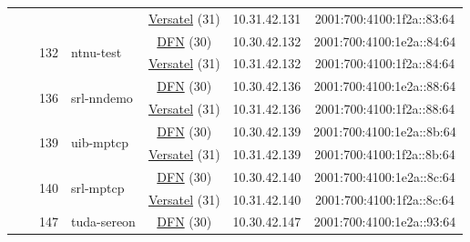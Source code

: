 \begin{small}
\begin{center}
\begin{longtable}{|c|c|c|c|c|c|c|c|}
  &  &  &  & \multicolumn{2}{|c|}{\tiny{\href{http://www.versatel.de}{Versatel} (31)}} & \tiny{10.31.42.131} & \tiny{2001:700:4100:1f2a::83:64} \\* \cline{3-3}\cline{4-4}\cline{5-5}\cline{6-6}\cline{7-7}\cline{8-8}
  &  & \multirow{2}{*}{\tiny{132}} & \multicolumn{1}{|l|}{\multirow{2}{*}{\tiny{ntnu-test}}} & \multicolumn{2}{|c|}{\tiny{\href{https://www.dfn.de}{DFN} (30)}} & \tiny{10.30.42.132} & \tiny{2001:700:4100:1e2a::84:64} \\* \cline{5-5}\cline{6-6}\cline{7-7}\cline{8-8}
  &  &  &  & \multicolumn{2}{|c|}{\tiny{\href{http://www.versatel.de}{Versatel} (31)}} & \tiny{10.31.42.132} & \tiny{2001:700:4100:1f2a::84:64} \\* \cline{3-3}\cline{4-4}\cline{5-5}\cline{6-6}\cline{7-7}\cline{8-8}
  &  & \multirow{2}{*}{\tiny{136}} & \multicolumn{1}{|l|}{\multirow{2}{*}{\tiny{srl-nndemo}}} & \multicolumn{2}{|c|}{\tiny{\href{https://www.dfn.de}{DFN} (30)}} & \tiny{10.30.42.136} & \tiny{2001:700:4100:1e2a::88:64} \\* \cline{5-5}\cline{6-6}\cline{7-7}\cline{8-8}
  &  &  &  & \multicolumn{2}{|c|}{\tiny{\href{http://www.versatel.de}{Versatel} (31)}} & \tiny{10.31.42.136} & \tiny{2001:700:4100:1f2a::88:64} \\* \cline{3-3}\cline{4-4}\cline{5-5}\cline{6-6}\cline{7-7}\cline{8-8}
  &  & \multirow{2}{*}{\tiny{139}} & \multicolumn{1}{|l|}{\multirow{2}{*}{\tiny{uib-mptcp}}} & \multicolumn{2}{|c|}{\tiny{\href{https://www.dfn.de}{DFN} (30)}} & \tiny{10.30.42.139} & \tiny{2001:700:4100:1e2a::8b:64} \\* \cline{5-5}\cline{6-6}\cline{7-7}\cline{8-8}
  &  &  &  & \multicolumn{2}{|c|}{\tiny{\href{http://www.versatel.de}{Versatel} (31)}} & \tiny{10.31.42.139} & \tiny{2001:700:4100:1f2a::8b:64} \\* \cline{3-3}\cline{4-4}\cline{5-5}\cline{6-6}\cline{7-7}\cline{8-8}
  &  & \multirow{2}{*}{\tiny{140}} & \multicolumn{1}{|l|}{\multirow{2}{*}{\tiny{srl-mptcp}}} & \multicolumn{2}{|c|}{\tiny{\href{https://www.dfn.de}{DFN} (30)}} & \tiny{10.30.42.140} & \tiny{2001:700:4100:1e2a::8c:64} \\* \cline{5-5}\cline{6-6}\cline{7-7}\cline{8-8}
  &  &  &  & \multicolumn{2}{|c|}{\tiny{\href{http://www.versatel.de}{Versatel} (31)}} & \tiny{10.31.42.140} & \tiny{2001:700:4100:1f2a::8c:64} \\* \cline{3-3}\cline{4-4}\cline{5-5}\cline{6-6}\cline{7-7}\cline{8-8}
  &  & \multirow{2}{*}{\tiny{147}} & \multicolumn{1}{|l|}{\multirow{2}{*}{\tiny{tuda-sereon}}} & \multicolumn{2}{|c|}{\tiny{\href{https://www.dfn.de}{DFN} (30)}} & \tiny{10.30.42.147} & \tiny{2001:700:4100:1e2a::93:64} \\* \cline{5-5}\cline{6-6}\cline{7-7}\cline{8-8}

\end{longtable}
\end{center}
\end{small}
